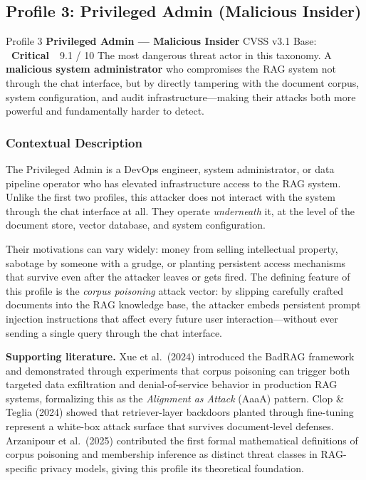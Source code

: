 \documentclass[11pt,a4paper]{report}
\newcommand{\badgecritical}{\colorbox{danger}{\color{white}\small\textbf{~Critical~}}}
\begin{document}
\newpage
\subsection{Profile 3: Privileged Admin (Malicious Insider)}

\begin{profilebanner}%
  {Profile 3 \enspace\textbf{Privileged Admin --- Malicious Insider}}%
  {CVSS v3.1 Base: \badgecritical\ 9.1 / 10}
  \small
  The most dangerous threat actor in this taxonomy. A \textbf{malicious
  system administrator} who compromises the RAG system not through the
  chat interface, but by directly tampering with the document corpus,
  system configuration, and audit infrastructure---making their attacks
  both more powerful and fundamentally harder to detect.
\end{profilebanner}

\subsubsection{Contextual Description}

\begin{prosebox}
The Privileged Admin is a DevOps engineer, system administrator, or data
pipeline operator who has elevated infrastructure access to the RAG system.
Unlike the first two profiles, this attacker does not interact with the
system through the chat interface at all. They operate \emph{underneath}
it, at the level of the document store, vector database, and system
configuration.

Their motivations can vary widely: money from selling intellectual property,
sabotage by someone with a grudge, or planting persistent access mechanisms
that survive even after the attacker leaves or gets fired.
The defining feature of this profile is the \emph{corpus poisoning} attack
vector: by slipping carefully crafted documents into the RAG knowledge base,
the attacker embeds persistent prompt injection instructions that affect
every future user interaction---without ever sending a single query through
the chat interface.

\medskip
\textbf{Supporting literature.}
Xue et al.\ (2024) introduced the BadRAG framework and demonstrated through
experiments that corpus poisoning can trigger both targeted data exfiltration
and denial-of-service behavior in production RAG systems, formalizing this as
the \emph{Alignment as Attack} (AaaA) pattern. Clop \& Teglia (2024)
showed that retriever-layer backdoors planted through fine-tuning represent
a white-box attack surface that survives document-level defenses.
Arzanipour et al.\ (2025) contributed the first formal mathematical
definitions of corpus poisoning and membership inference as distinct threat
classes in RAG-specific privacy models, giving this profile its theoretical
foundation.
\end{prosebox}
\end{document}
